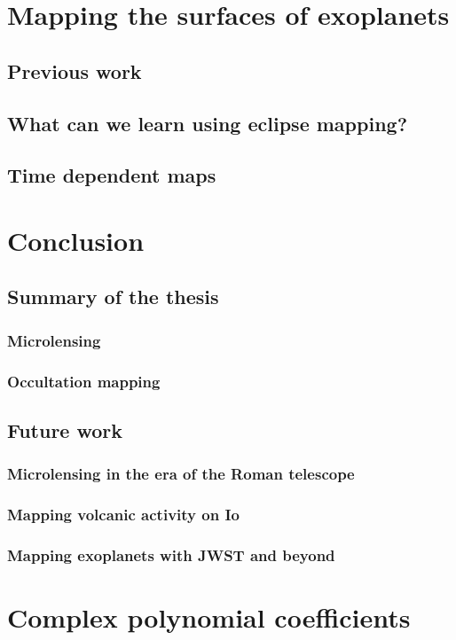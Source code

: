 \documentclass[12pt]{report}
\begin{document}
\chapter{Mapping the surfaces of exoplanets}
\label{ch:mapping_exoplanets}
\section{Previous work}
\section{What can we learn using eclipse mapping?}
\section{Time dependent maps}

\chapter{Conclusion}
\section{Summary of the thesis}
\subsection{Microlensing}
\subsection{Occultation mapping}
\section{Future work}
\subsection{Microlensing in the era of the Roman telescope}
\subsection{Mapping volcanic activity on Io}
\subsection{Mapping exoplanets with JWST and beyond}

\appendix

\chapter{Complex polynomial coefficients}
\label{app:complex_poly}
\end{document}
